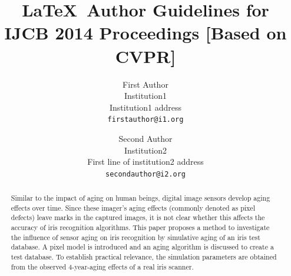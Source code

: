 \documentclass[10pt,twocolumn,letterpaper]{article}
\begin{document}
\title{\LaTeX\ Author Guidelines for IJCB 2014 Proceedings [Based on CVPR]}

\author{First Author\\
Institution1\\
Institution1 address\\
{\tt\small firstauthor@i1.org}
\and
Second Author\\
Institution2\\
First line of institution2 address\\
{\tt\small secondauthor@i2.org}
}

\maketitle
\thispagestyle{empty}

\begin{abstract}
   Similar to the impact of aging on human beings, digital image sensors develop aging effects over time. Since these imager's aging effects (commonly denoted as pixel defects) leave marks in the captured images, it is not clear whether this affects the accuracy of iris recognition algorithms. This paper proposes a method to investigate the influence of sensor aging on iris recognition by simulative aging of an iris test database. A pixel model is introduced and an aging algorithm is discussed to create a test database. To establish practical relevance, the simulation parameters are obtained from the observed 4-year-aging effects of a real iris scanner.
\end{abstract}

\end{document}
